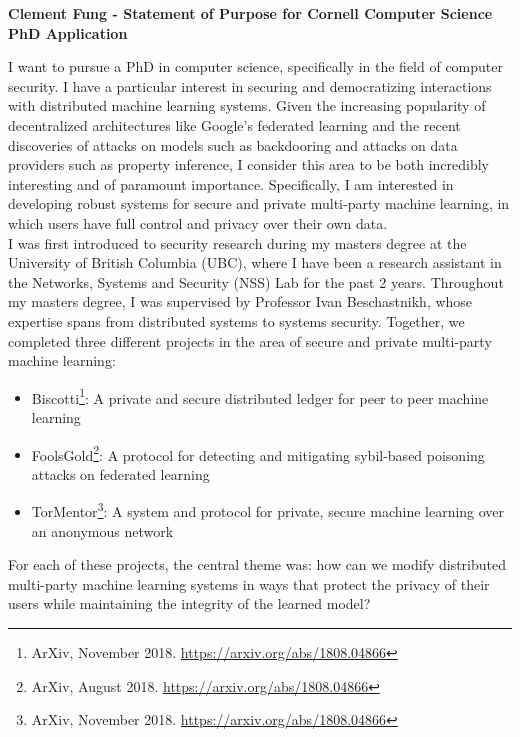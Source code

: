 \documentclass[10pt]{article} %
\begin{document}
\begin{center}
{\Large \bf Clement Fung - Statement of Purpose for Cornell Computer Science PhD Application}
\end{center}

I want to pursue a PhD in computer science, specifically in the field of computer security. I have a particular interest in securing and democratizing interactions with distributed machine learning systems. Given the increasing popularity of decentralized architectures like Google’s federated learning and the recent discoveries of attacks on models such as backdooring and attacks on data providers such as property inference, I consider this area to be both incredibly interesting and of paramount importance. Specifically, I am interested in developing robust systems for secure and private multi-party machine learning, in which users have full control and privacy over their own data. \\

I was first introduced to security research during my masters degree at the University of British Columbia (UBC), where I have been a research assistant in the Networks, Systems and Security (NSS) Lab for the past 2 years. Throughout my masters degree, I was supervised by Professor Ivan Beschastnikh, whose expertise spans from distributed systems to systems security. Together, we completed three different projects in the area of secure and private multi-party machine learning:
\begin{itemize}
\item Biscotti\footnote{ArXiv, November 2018. \url{https://arxiv.org/abs/1808.04866}}: A private and secure distributed ledger for peer to peer machine learning
\item FoolsGold\footnote{ArXiv, August 2018. \url{https://arxiv.org/abs/1808.04866}}: A protocol for detecting and mitigating sybil-based poisoning attacks on federated learning
\item TorMentor\footnote{ArXiv, November 2018. \url{https://arxiv.org/abs/1808.04866}}: A system and protocol for private, secure machine learning over an anonymous network
\end{itemize}

For each of these projects, the central theme was: how can we modify distributed multi-party machine learning systems in ways that protect the privacy of their users while maintaining the integrity of the learned model? \\
\end{document}
